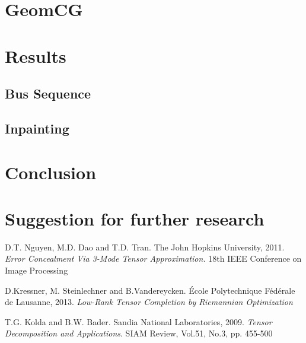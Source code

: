 \documentclass[a4paper, 11pt]{article} %
\begin{document}
\section{GeomCG}
\section{Results}
\subsection{Bus Sequence}
\subsection{Inpainting}

\section{Conclusion}
\section{Suggestion for further research}

\begin{thebibliography}{9}

D.T. Nguyen, M.D. Dao and T.D. Tran. {The John Hopkins University}, 2011.
\textit{Error Concealment Via 3-Mode Tensor Approximation.} 18th IEEE Conference on Image Processing


D.Kressner, M. Steinlechner and B.Vandereycken.{ \'Ecole Polytechnique F\'ed\'erale de Lausanne}, 2013. \textit{Low-Rank Tensor Completion by Riemannian Optimization}


  T.G. Kolda and B.W. Bader. {Sandia National Laboratories}, 2009.
\textit{Tensor Decomposition and Applications}. SIAM Review, Vol.51, No.3, pp. 455-500
\end{thebibliography}

%
%
%
\end{document}
